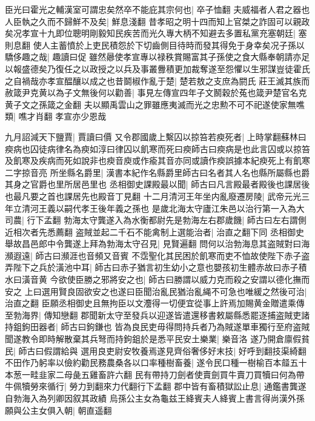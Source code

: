 臣光曰霍光之輔漢室可謂忠矣然卒不能庇其宗何也|{
	卒子恤翻}
夫威福者人君之器也人臣執之久而不歸鮮不及矣|{
	鮮息淺翻}
昔孝昭之明十四而知上官桀之詐固可以親政矣况孝宣十九即位聰明剛毅知民疾苦而光久專大柄不知避去多置私黨充塞朝廷|{
	塞則息翻}
使人主蓄憤於上吏民積怨於下切齒側目待時而發其得免于身幸矣况子孫以驕侈趣之哉|{
	趣讀曰促}
雖然曏使孝宣專以禄秩賞賜富其子孫使之食大縣奉朝請亦足以報盛德矣乃復任之以政授之以兵及事叢釁積更加裁奪遂至怨懼以生邪謀豈徒霍氏之自禍哉亦孝宣醖釀以成之也昔鬬椒作亂于楚|{
	楚若敖之支庶為閼氏}
莊王滅其族而赦箴尹克黄以為子文無後何以勸善|{
	事見左傳宣四年子文鬭穀於菟也箴尹楚官名克黄子文之孫箴之金翻}
夫以顯禹雲山之罪雖應夷滅而光之忠勲不可不祀遂使家無噍類|{
	噍才肖翻}
孝宣亦少恩哉

九月詔減天下鹽賈|{
	賈讀曰價}
又令郡國歲上繫囚以掠笞若瘐死者|{
	上時掌翻蘇林曰瘐病也囚徒病律名為瘐如淳曰律囚以飢寒而死曰瘐師古曰瘐病是也此言囚或以掠笞及飢寒及疾病而死如說非也瘐音庾或作瘉其音亦同或讀作瘐誤據本紀瘐死上有飢寒二字掠音亮}
所坐縣名爵里|{
	漢書本紀作名縣爵里師古曰名者其人名也縣所屬縣也爵其身之官爵也里所居邑里也}
丞相御史課殿最以聞|{
	師古曰凡言殿最者殿後也課居後也最凡要之首也課居先也殿音丁見翻}
十二月清河王年坐内亂廢遷房陵|{
	武帝元光三年立清河王義以嗣代孝王後年義之孫也}
是歲北海太守廬江朱邑以治行第一入為大司農|{
	行下孟翻}
勃海太守龔遂入為水衡都尉先是勃海左右郡歲饑|{
	師古曰左右謂側近相次者先悉薦翻}
盗賊並起二千石不能禽制上選能治者|{
	治直之翻下同}
丞相御史舉故昌邑郎中令龔遂上拜為勃海太守召見|{
	見賢遍翻}
問何以治勃海息其盗賊對曰海瀕遐遠|{
	師古曰瀕涯也音頻又音賓}
不霑聖化其民困於飢寒而吏不恤故使陛下赤子盗弄陛下之兵於潢池中耳|{
	師古曰赤子猶言初生幼小之意也嬰孩初生體赤故曰赤子積水曰潢音黄}
今欲使臣勝之邪將安之也|{
	師古曰勝謂以威力克而殺之安謂以德化撫而安之}
上曰選用賢良固欲安之也遂曰臣聞治亂民猶治亂䋲不可急也唯緩之然後可治|{
	治直之翻}
臣願丞相御史且無拘臣以文灋得一切便宜從事上許焉加賜黄金贈遣乘傳至勃海界|{
	傳知戀翻}
郡聞新太守至發兵以迎遂皆遣還移書敕屬縣悉罷逐捕盗賊吏諸持鉏鉤田器者|{
	師古曰鉤鎌也}
皆為良民吏毋得問持兵者乃為賊遂單車獨行至府盗賊聞遂教令即時解散棄其兵弩而持鉤鉏於是悉平民安土樂業|{
	樂音洛}
遂乃開倉廪假貧民|{
	師古曰假謂給與}
選用良吏尉安牧養焉遂見齊俗奢侈好末技|{
	好呼到翻技渠綺翻}
不田作乃躬率以儉約勸民務農桑各以口率種樹畜養|{
	遂令民口種一樹榆百本䪥五十本葱一畦韭家二母彘五雞畜許六翻}
民有帶持刀劍者使賣劍買牛賣刀買犢曰何為帶牛佩犢勞來循行|{
	勞力到翻來力代翻行下孟翻}
郡中皆有畜積獄訟止息|{
	通鑑書龔遂自勃海入為列卿因叙其政績}
烏孫公主女為龜兹王絳賓夫人絳賓上書言得尚漢外孫願與公主女俱入朝|{
	朝直遥翻}


